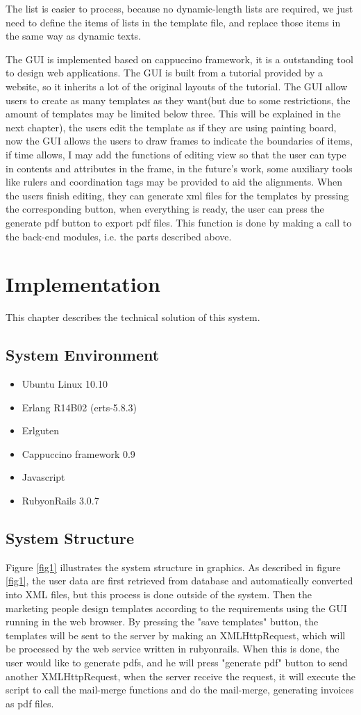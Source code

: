 \documentclass[12pt,twoside,a4paper]{report}
\begin{document}
  The list is easier to process, because no dynamic-length lists are required, we just need to define the items of lists in the template file, and replace those items in the same way as dynamic texts.

  The GUI is implemented based on cappuccino framework, it is a outstanding tool to design web applications. The GUI is built from a tutorial provided by a website\cite{tut}, so it inherits a lot of the original layouts of the tutorial. The GUI allow users to create as many templates as they want(but due to some restrictions, the amount of templates may be limited below three. This will be explained in the next chapter), the users edit the template as if they are using painting board, now the GUI allows the users to draw frames to indicate the boundaries of items, if time allows, I may add the functions of editing view so that the user can type in contents and attributes in the frame, in the future's work, some auxiliary tools like rulers and coordination tags may be provided to aid the alignments. When the users finish editing, they can generate xml files for the templates by pressing the corresponding button, when everything is ready, the user can press the generate pdf button to export pdf files. This function is done by making a call to the back-end modules, i.e. the parts described above.

\chapter{Implementation}
  This chapter describes the technical solution of this system. 
\section{System Environment}
\begin{itemize}
\item Ubuntu Linux 10.10
\item Erlang R14B02 (erts-5.8.3)
\item Erlguten 
\item Cappuccino framework 0.9
\item Javascript
\item RubyonRails 3.0.7
\end{itemize}
\section{System Structure}
  Figure \ref{fig1} illustrates the system structure in graphics. As described in figure \ref{fig1}, the user data are first retrieved from database and automatically converted into XML files, but this process is done outside of the system. Then the marketing people design templates according to the requirements using the GUI running in the web browser. By pressing the "save templates" button, the templates will be sent to the server by making an XMLHttpRequest\cite{XHR}, which will be processed by the web service written in rubyonrails. When this is done, the user would like to generate pdfs, and he will press "generate pdf" button to send another XMLHttpRequest, when the server receive the request, it will execute the script to call the mail-merge functions and do the mail-merge, generating invoices as pdf files. 
\end{document}

